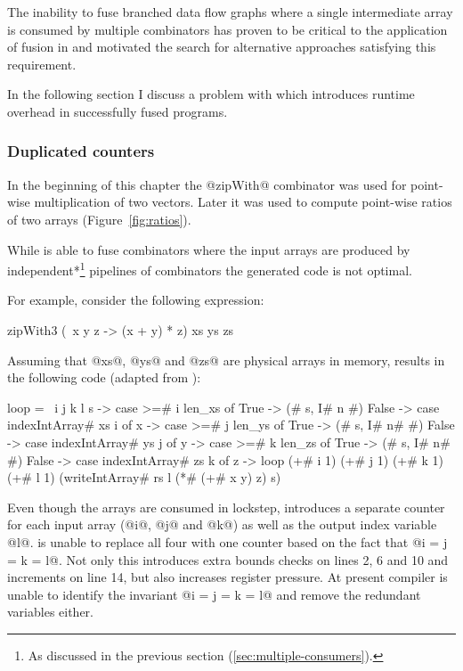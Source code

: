 \documentclass[preamble.tex]{subfiles}
\begin{document}
The inability to fuse branched data flow graphs where a single intermediate array is consumed by multiple combinators has proven to be critical to the application of fusion in \DPH and motivated the search for alternative approaches satisfying this requirement.

In the following section I discuss a problem with \StreamFusion which introduces runtime overhead in successfully fused programs.


\subsubsection{Duplicated counters}
\label{sec:duplicated-counters}

In the beginning of this chapter the @zipWith@ combinator was used for point-wise multiplication of two vectors. Later it was used to compute point-wise ratios of two arrays (Figure~\ref{fig:ratios}).

While \StreamFusion is able to fuse  combinators where the input arrays are produced by \*independent*\footnote{As discussed in the previous section (\ref{sec:multiple-consumers}).} pipelines of combinators the generated code is not optimal.

For example, consider the following expression:

\begin{hscode}
zipWith3 (\ x y z -> (x + y) * z) xs ys zs
\end{hscode}

Assuming that @xs@, @ys@ and @zs@ are physical arrays in memory, \StreamFusion results in the following  code (adapted from \cite{FlowFusion}):

\begin{hscode}[numbers=left]
loop = \ i j k l s ->
  case >=# i len_xs of
    True  -> (# s, I# n #)
    False ->
      case indexIntArray# xs i of x ->
        case >=# j len_ys of
          True  -> (# s, I# n# #)
          False ->
            case indexIntArray# ys j of y ->
              case >=# k len_zs of
                True  -> (# s, I# n# #)
                False ->
                  case indexIntArray# zs k of z ->
                    loop (+# i 1) (+# j 1) (+# k 1) (+# l 1)
                      (writeIntArray# rs l (*# (+# x y) z) s)
\end{hscode}

Even though the arrays are consumed in lockstep, \StreamFusion introduces a separate counter for each input array (@i@, @j@ and @k@) as well as the output index variable @l@. \StreamFusion is unable to replace all four with one counter based on the fact that @i = j = k = l@. Not only this introduces extra bounds checks on lines 2, 6 and 10 and increments on line 14, but also increases register pressure. At present \GHC compiler is unable to identify the invariant @i = j = k = l@ and remove the redundant variables either.
\end{document}
